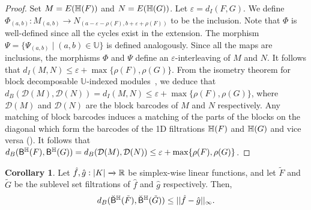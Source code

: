 \documentclass[10pt,a4paper]{amsart}
\newcommand {\mm}[1] {\ifmmode{#1}\else{\mbox{\(#1\)}}\fi}
\newcommand{\Rspace}        {\mm{\mathbb{R}}}
\newcommand{\har}           {\mm{\mathbb{H}}}
\newcommand{\eps}        {\varepsilon}
\theoremstyle{definition}
\newcommand{\hbarc}{\mathsf{B}^\har}
\newcommand{\obarc}{\breve{\mathsf{B}}^\har}
\newtheorem{corollary}[theorem]{Corollary}
\theoremstyle{remark}
\begin{document}
\begin{proof}
    
    Set $M=E(\har(F))$ and $N=E(\har(G))$.  Let $\eps = d_{I}(F,G)$. We define $\Phi_{(a,b)}: M_{(a,b)} \xrightarrow{} N_{(a-\eps-\rho(F), b+\eps+\rho(F))}$ to be the inclusion. Note that $\Phi$ is well-defined since all the cycles exist in the extension. %
    The morphism $\Psi = \{ \Psi_{(a,b)}\mid (a,b)\in \mathbb{U} \}$ is defined analogously. Since all the maps are inclusions, the morphisms $\Phi$ and $\Psi$ define an $\eps$-interleaving of $M$ and $N$. It follows that $d_I (M,N) \leq \eps+\max \{\rho(F), \rho(G) \}$.
    From the isometry theorem for block decomposable $\mathbb{U}$-indexed modules~\cite{bjerkevik2021stability,botnan2018algebraic}, we deduce that $d_B( {\mathcal{D}} (M), {\mathcal{D}} (N)) = d_I(M,N) \leq \eps +\max \{\rho(F), \rho(G) \}$, where ${\mathcal{D}}(M)$ and ${\mathcal{D}}(N)$ are the block barcodes of $M$ and $N$ respectively. Any matching of block barcodes induces a matching of the parts of the blocks on the diagonal which form the barcodes of the 1D filtrations $\har(F)$ and $\har(G)$ and vice versa (\cite[Proposition 4.2]{botnan2018algebraic}). It follows that $d_B (\hbarc(F), \hbarc(G)) = d_B( {\mathcal{D}} (M), {\mathcal{D}} (N))  \leq \eps + \max \{\rho(F), \rho(G)\}$. 
\end{proof}





\begin{corollary}
Let $\hat{f}, \hat{g} : |K| \xrightarrow{} \Rspace$ be simplex-wise linear functions, and let $\tilde{F}$ and $\tilde{G}$ be the sublevel set filtrations of $\hat{f}$ and $\hat{g}$ respectively. Then, $$d_{B}({\obarc(\tilde{F})}, {\obarc(\tilde{G}})) \leq || \hat{f}-\hat{g}||_{\infty}.$$
\end{corollary}
\end{document}
